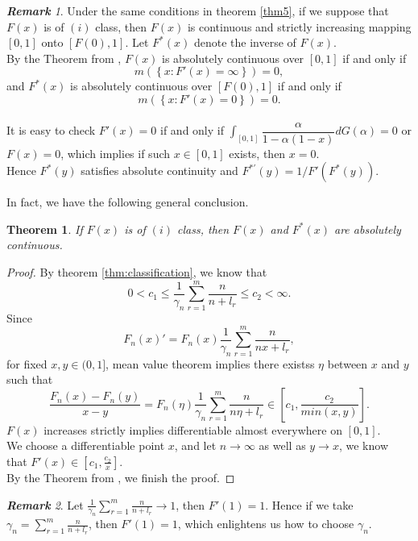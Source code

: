 \documentclass[12pt]{article}
\theoremstyle{plain}
\newtheorem{thm}{\textbf{Theorem}}
\theoremstyle{definition}
\theoremstyle{remark}
\newtheorem{rem}{\textbf{Remark}}
\begin{document}
\begin{rem}
	Under the same conditions in theorem \ref{thm5}, if we suppose that $F(x)$ is of $(i)$ class, then $F(x)$ is continuous and strictly increasing mapping $[0,1]$ onto $[F(0),1]$. Let $F^*(x)$ denote the inverse of $F(x)$. \\
	By the Theorem from \cite{abs},  $F(x)$ is absolutely continuous over $[0,1]$ if and only if 
	\begin{equation*}
	m\left(\left\{x : F'(x)=\infty \right\}\right)=0,
	\end{equation*}
	 and $F^*(x)$ is absolutely continuous over $[F(0),1]$ if and only if 
	\begin{equation*}
		m\left(\left\{x : F'(x)=0\right\}\right)=0.
	\end{equation*}\\
	It is easy to check $F'(x)=0$ if and only if $\int_{[0,1]}\dfrac{\alpha}{1-\alpha(1-x)}dG(\alpha)=0$ or $F(x)=0$, which implies if such $x\in [0,1]$ exists, then $x=0$.\\
	Hence $F^*(y)$ satisfies absolute continuity and $F^{*\prime}(y)=1/F'(F^*(y))$.
\end{rem}

In fact, we have the following general conclusion. 
\begin{thm}\label{absFF*}
    If $F(x)$ is of $(i)$ class, then $F(x)$ and $F^*(x)$ are absolutely continuous.
\end{thm}
\begin{proof}
By theorem \ref{thm:classification}, we know that 
\begin{equation*}
0<c_{1} \leqslant \frac{1}{\gamma_{n}} \sum_{r=1}^{m} \frac{n}{n+l_{r}} \leqslant c_{2}<\infty.
\end{equation*}
Since 
\begin{equation*}
F_n(x)'=F_n(x)\dfrac{1}{\gamma_{n}}\sum_{r=1}^{m}\dfrac{n}{nx+l_r},
\end{equation*}
for fixed $x,y\in(0,1]$, mean value theorem implies there existss $\eta$ between $x$ and $y$ such that
\begin{equation*}
\dfrac{F_n(x)-F_n(y)}{x-y}=F_n(\eta)\frac{1}{\gamma_{n}} \sum_{r=1}^{m} \frac{n}{n\eta+l_{r}}\in [c_1,\frac{c_2}{min(x,y)}].
\end{equation*}
$F(x)$ increases strictly implies differentiable almost everywhere on $[0,1]$. \\
We choose a differentiable point $x$, and let $n\rightarrow \infty$ as well as $y\rightarrow x$, we know that $F'(x)\in [c_1,\frac{c_2}{x}]$. \\
By the Theorem from \cite{abs}, we finish the proof.
\end{proof}
\begin{rem}
	Let $\frac{1}{\gamma_{n}} \sum_{r=1}^{m} \frac{n}{n+l_{r}}\rightarrow 1$, then $F'(1)=1$. Hence if we take $\gamma_n=\sum_{r=1}^{m} \frac{n}{n+l_{r}}$, then $F'(1)=1$, which enlightens us how to choose $\gamma_n$.
\end{rem}
\end{document}
